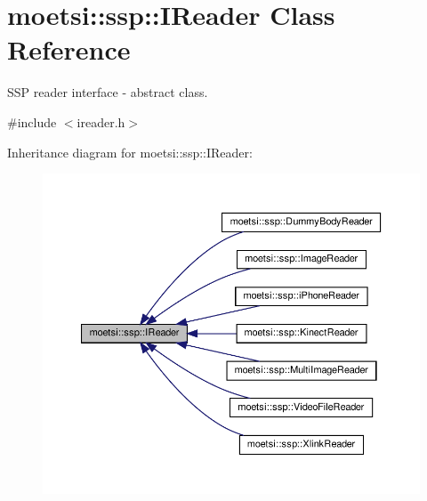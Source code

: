 \hypertarget{classmoetsi_1_1ssp_1_1IReader}{}\section{moetsi\+:\+:ssp\+:\+:I\+Reader Class Reference}
\label{classmoetsi_1_1ssp_1_1IReader}


S\+SP reader interface -\/ abstract class.  




{\ttfamily \#include $<$ireader.\+h$>$}



Inheritance diagram for moetsi\+:\+:ssp\+:\+:I\+Reader\+:
\nopagebreak
\begin{figure}[H]
\begin{center}
\leavevmode
\includegraphics[width=350pt]{classmoetsi_1_1ssp_1_1IReader__inherit__graph}
\end{center}
\end{figure}
